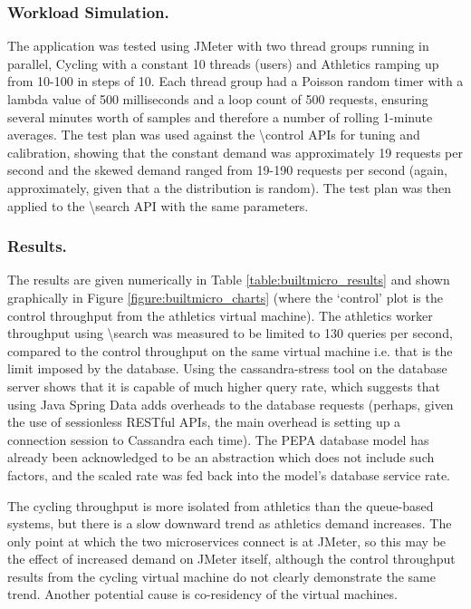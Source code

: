\subsubsection{Workload Simulation.}  The application was tested using JMeter with two thread groups running in parallel, Cycling with a constant 10 threads (users) and Athletics ramping up from 10-100 in steps of 10.  Each thread group had a Poisson random timer with a lambda value of 500 milliseconds and a loop count of 500 requests, ensuring several minutes worth of samples and therefore a number of rolling 1-minute averages.  The test plan was used against the {\textbackslash control} APIs for tuning and calibration, showing that the constant demand was approximately 19 requests per second and the skewed demand ranged from 19-190 requests per second (again, approximately, given that a the distribution is random). The test plan was then applied to the {\textbackslash search} API with the same parameters.

\subsubsection{Results.}  The results are given numerically in Table \ref{table:builtmicro_results} and shown graphically in Figure \ref{figure:builtmicro_charts} (where the `control' plot is the control throughput from the athletics virtual machine).  The athletics worker throughput using {\textbackslash search} was measured to be limited to 130 queries per second, compared to the control throughput on the same virtual machine i.e. that is the limit imposed by the database.  Using the cassandra-stress tool on the database server shows that it is capable of much higher query rate, which suggests that using Java Spring Data adds overheads to the database requests (perhaps, given the use of sessionless RESTful APIs, the main overhead is setting up a connection session to Cassandra each time).  The PEPA database model has already been acknowledged to be an abstraction which does not include such factors, and the scaled rate was fed back into the model's database service rate.

The cycling throughput is more isolated from athletics than the queue-based systems, but there is a slow downward trend as athletics demand increases.  The only point at which the two microservices connect is at JMeter, so this may be the effect of increased demand on JMeter itself, although the control throughput results from the cycling virtual machine do not clearly demonstrate the same trend.  Another potential cause is co-residency of the virtual machines.

